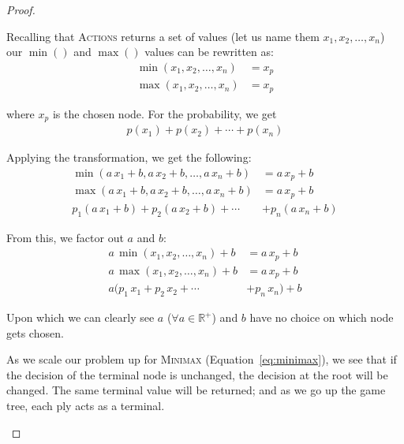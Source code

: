 \documentclass[12pt]{scrartcl}
\begin{document}
\begin{proof}
\begin{description}
            Recalling that \textsc{Actions} returns a set of values (let us name them $x_1, x_2, \ldots, x_n$) our $\min\left(\right)$ and $\max\left(\right)$ values can be rewritten as:
            \begin{align*}
                \min\left( x_1, x_2, \ldots, x_n \right) &= x_p \\
                \max\left( x_1, x_2, \ldots, x_n \right) &= x_p
            \end{align*}

            where $x_p$ is the chosen node. For the probability, we get
            \begin{align*}
                p\left(x_1\right) + p\left(x_2\right) + \cdots + p\left(x_n\right)
            \end{align*}

            Applying the transformation, we get the following:
            \begin{align*}
                \min\left( a\,x_1 + b, a\,x_2 + b, \ldots, a\,x_n + b\right) &= a\,x_p + b \\
                \max\left( a\,x_1 + b, a\,x_2 + b, \ldots, a\,x_n + b\right) &= a\,x_p + b \\
                p_1\left(a\,x_1 + b\right) + p_2\left(a\,x_2 + b\right) + \cdots &+ p_n\left(a\,x_n + b\right)
            \end{align*}

            From this, we factor out $a$ and $b$:
            \begin{align*}
                a\,\min\left( x_1, x_2, \ldots, x_n \right) + b &= a\,x_p + b \\
                a\,\max\left( x_1, x_2, \ldots, x_n \right) + b &= a\,x_p + b \\
                a(p_1\,x_1 + p_2\,x_2 + \cdots &+ p_n\,x_n) + b
            \end{align*}

        Upon which we can clearly see $a$ ($\forall a \in \mathbb{R}^+$) and $b$ have no choice on which node gets chosen.

    \item[Inductive Step] As we scale our problem up for \textsc{Minimax} (Equation~\ref{eq:minimax}), we see that if the decision of the terminal node is unchanged, the decision at the root will be changed. The same terminal value will be returned; and as we go up the game tree, each ply acts as a terminal.
\end{description}

\end{proof}
\end{document}
